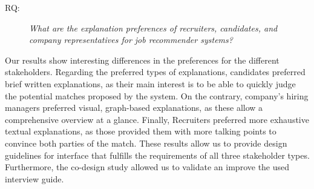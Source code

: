 \begin{description}
    \item[RQ:] \textit{What are the explanation preferences of recruiters, candidates, and company representatives for job recommender systems?}
    \newline
\end{description}

Our results show interesting differences in the preferences for the different stakeholders. Regarding the preferred types of explanations, candidates preferred brief written explanations, as their main interest is to be able to quickly judge the potential matches proposed by the system. On the contrary, company's hiring managers preferred visual, graph-based explanations, as these allow a comprehensive overview at a glance. Finally, Recruiters preferred more exhaustive textual explanations, as those provided them with more talking points to convince both parties of the match. These results allow us to provide design guidelines for interface that fulfills the requirements of all three stakeholder types. Furthermore, the co-design study allowed us to validate an improve the used interview guide. 





